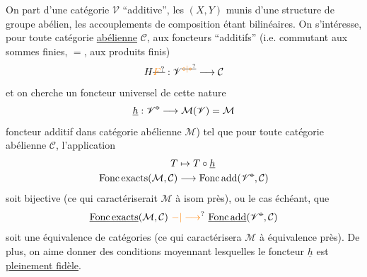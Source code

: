 On part d'une catégorie $\mathscr V$ ``additive'',  les $(X,Y)$  munis d'une structure de groupe abélien, les accouplements de composition étant bilinéaires.  On s'intéresse, pour toute catégorie \uline{abélienne} $\mathcal C$, aux foncteurs  ``additifs'' (i.e. commutant aux sommes finies,  $=$, aux produits finis)
\[
 H\deleted{\unsure{F}}:\mathscr V^{\deleted{\unsure{\circ|*}}}\longrightarrow\mathcal C
\]
et on cherche un foncteur universel de cette nature
\[
 \underline{h}:\mathscr V^{\deleted{\circ}}\longrightarrow\mathcal M(\mathscr V)=\mathcal M
\]
foncteur additif dans catégorie abélienne $\mathcal M$) tel que pour toute catégorie abélienne $\mathcal C$, l'application
\[
\begin{aligned}
 T&\mapsto T\circ\underline h\\
 \operatorname{Fonc\,exacts}(\mathcal M,\mathcal C)&\longrightarrow\operatorname{Fonc\,add}(\mathscr V^{\deleted{\circ}},\mathcal C)
\end{aligned}
\]
soit bijective (ce qui caractériserait $\mathcal M$ à  isom près), ou le cas échéant, que
\[
 \underline{\operatorname{Fonc\,exacts}}(\mathcal M,\mathcal C)\ \unsure{\mathord{-}|\longrightarrow}\ \underline{\operatorname{Fonc\,add}}(\mathscr V^{\deleted{\circ}},\mathcal C)
\]
soit une équivalence de catégories (ce qui
caractérisera $\mathcal M$ à équivalence près). De plus, on aime donner des conditions moyennant lesquelles le foncteur $\underline h$ est \uline{pleinement fidèle}.

